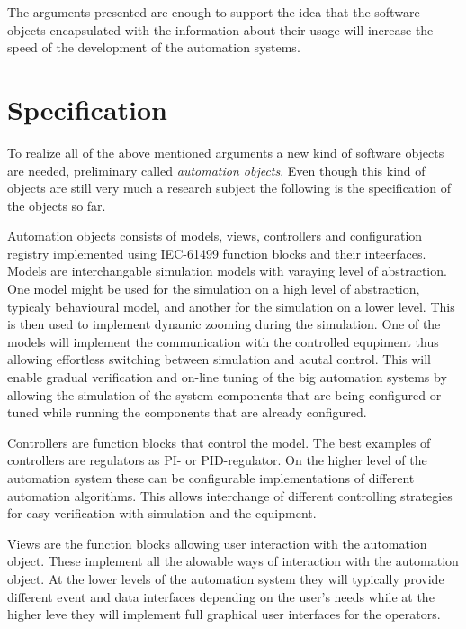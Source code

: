 The arguments presented are enough to support the idea that
the software objects encapsulated with the information about
their usage will increase the speed of the development of
the automation systems.




\section{Specification}
To realize all of the above mentioned arguments a new kind
of software objects are needed, preliminary called
\emph{automation objects}. Even though this kind of objects
are still very much a research subject the following is the
specification of the objects so far.

Automation objects consists of models, views, controllers
and configuration registry implemented using IEC-61499
function blocks and their inteerfaces. Models are
interchangable simulation models with varaying level of
abstraction. One model might be used for the simulation on a
high level of abstraction, typicaly behavioural model, and
another for the simulation on a lower level. This is then
used to implement dynamic zooming during the simulation. One
of the models will implement the communication with the
controlled equpiment thus allowing effortless switching
between simulation and acutal control. This will enable
gradual verification and on-line tuning of the big
automation systems by allowing the simulation of the system
components that are being configured or tuned while running
the components that are already configured.

Controllers are function blocks that control the model. The
best examples of controllers are regulators as PI- or
PID-regulator. On the higher level of the automation system
these can be configurable implementations of different
automation algorithms. This allows interchange of different
controlling strategies for easy verification with simulation
and the equipment.

Views are the function blocks allowing user interaction with
the automation object. These implement all the alowable ways
of interaction with the automation object. At the lower
levels of the automation system they will typically provide
different event and data interfaces depending on the user's
needs while at the higher leve they will implement full
graphical user interfaces for the operators.

